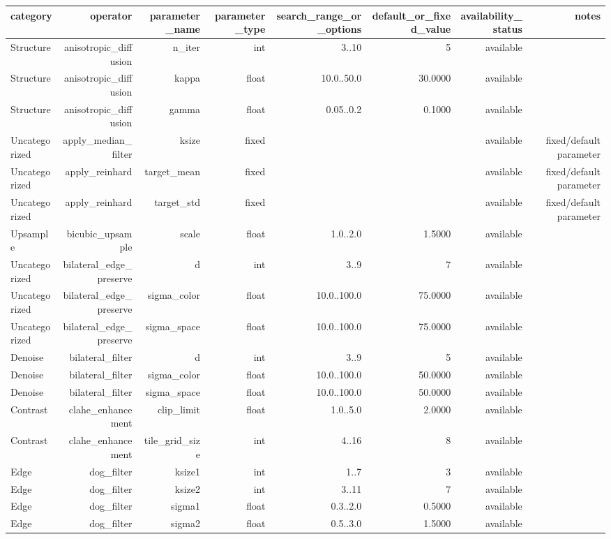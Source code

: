 \begin{tabular}{lrrrrrrr}
\hline
category & operator & parameter\_name & parameter\_type & search\_range\_or\_options & default\_or\_fixed\_value & availability\_status & notes \\
\hline
Structure & anisotropic\_diffusion & n\_iter & int & 3..10 & 5 & available &  \\
Structure & anisotropic\_diffusion & kappa & float & 10.0..50.0 & 30.0000 & available &  \\
Structure & anisotropic\_diffusion & gamma & float & 0.05..0.2 & 0.1000 & available &  \\
Uncategorized & apply\_median\_filter & ksize & fixed &  &  & available & fixed/default parameter \\
Uncategorized & apply\_reinhard & target\_mean & fixed &  &  & available & fixed/default parameter \\
Uncategorized & apply\_reinhard & target\_std & fixed &  &  & available & fixed/default parameter \\
Upsample & bicubic\_upsample & scale & float & 1.0..2.0 & 1.5000 & available &  \\
Uncategorized & bilateral\_edge\_preserve & d & int & 3..9 & 7 & available &  \\
Uncategorized & bilateral\_edge\_preserve & sigma\_color & float & 10.0..100.0 & 75.0000 & available &  \\
Uncategorized & bilateral\_edge\_preserve & sigma\_space & float & 10.0..100.0 & 75.0000 & available &  \\
Denoise & bilateral\_filter & d & int & 3..9 & 5 & available &  \\
Denoise & bilateral\_filter & sigma\_color & float & 10.0..100.0 & 50.0000 & available &  \\
Denoise & bilateral\_filter & sigma\_space & float & 10.0..100.0 & 50.0000 & available &  \\
Contrast & clahe\_enhancement & clip\_limit & float & 1.0..5.0 & 2.0000 & available &  \\
Contrast & clahe\_enhancement & tile\_grid\_size & int & 4..16 & 8 & available &  \\
Edge & dog\_filter & ksize1 & int & 1..7 & 3 & available &  \\
Edge & dog\_filter & ksize2 & int & 3..11 & 7 & available &  \\
Edge & dog\_filter & sigma1 & float & 0.3..2.0 & 0.5000 & available &  \\
Edge & dog\_filter & sigma2 & float & 0.5..3.0 & 1.5000 & available &  \\

\end{tabular}
